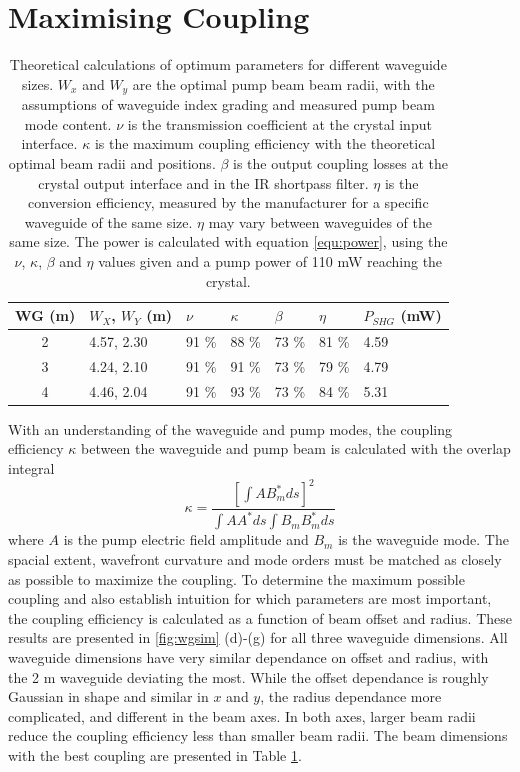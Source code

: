 \documentclass[9pt,twocolumn,twoside]{pnas-new}
\begin{document}
\section*{Maximising Coupling}

\begin{table}
	\centering
	\begin{tabular}{@{}cllllll@{}}
		\toprule
		WG (\textmu m) & $W_X$, $W_Y$ (\textmu m) & $\nu$ & $\kappa$ & $\beta$ & $\eta$ & $P_{SHG}$ (mW)\\
		\midrule
		2 & 4.57, 2.30 & 91 \% & 88 \% & 73 \% & 81 \% & 4.59 \\
		3 & 4.24, 2.10 & 91 \% & 91 \% & 73 \% & 79 \% & 4.79 \\
		4 & 4.46, 2.04 & 91 \% & 93 \% & 73 \% & 84 \% & 5.31 \\
		\bottomrule
	\end{tabular}
	\caption{Theoretical calculations of optimum parameters for different waveguide sizes. $W_x$ and $W_y$ are the optimal pump beam beam radii, with the assumptions of waveguide index grading and measured pump beam mode content. $\nu$ is the transmission coefficient at the crystal input interface. $\kappa$ is the maximum coupling efficiency with the theoretical optimal beam radii and positions. $\beta$ is the output coupling losses at the crystal output interface and in the IR shortpass filter. $\eta$ is the conversion efficiency, measured by the manufacturer for a specific waveguide of the same size. $\eta$ may vary between waveguides of the same size. The power is calculated with equation \ref{equ:power}, using the $\nu$, $\kappa$, $\beta$ and $\eta$ values given and a pump power of 110 mW reaching the crystal.}
	\label{tabl:wgsize}
\end{table}

With an understanding of the waveguide and pump modes, the coupling efficiency $\kappa$ between the waveguide and pump beam is calculated with the overlap integral
$$
	\kappa = \frac{\left[ \int A B^\ast_m ds\right]^2}{\int A A^* ds \int B_m B^\ast_m ds}
$$
where $A$ is the pump electric field amplitude and $B_m$ is the waveguide mode. The spacial extent, wavefront curvature and mode orders must be matched as closely as possible to maximize the coupling. To determine the maximum possible coupling and also establish intuition for which parameters are most important, the coupling efficiency is calculated as a function of beam offset and radius. These results are presented in \ref{fig:wgsim} (d)-(g) for all three waveguide dimensions. All waveguide dimensions have very similar dependance on offset and radius, with the 2 \textmu m waveguide deviating the most. While the offset dependance is roughly Gaussian in shape and similar in $x$ and $y$, the radius dependance more complicated, and different in the beam axes. In both axes, larger beam radii reduce the coupling efficiency less than smaller beam radii. The beam dimensions with the best coupling are presented in Table \ref{tabl:wgsize}. 
\end{document}
